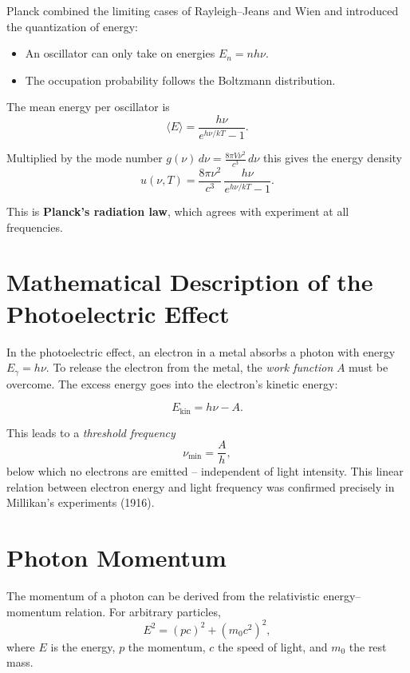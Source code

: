 Planck combined the limiting cases of Rayleigh–Jeans and Wien and introduced
the quantization of energy:

\begin{itemize}
	\item An oscillator can only take on energies $E_n = nh\nu$.
	\item The occupation probability follows the Boltzmann distribution.
\end{itemize}

The mean energy per oscillator is
\[
\langle E \rangle = \frac{h\nu}{e^{h\nu/kT} - 1}.
\]

Multiplied by the mode number
$g(\nu)\, d\nu = \tfrac{8\pi V \nu^2}{c^3}\, d\nu$
this gives the energy density
\[
u(\nu, T) = \frac{8\pi \nu^2}{c^3}\,
\frac{h\nu}{e^{h\nu/kT} - 1}.
\]

This is \textbf{Planck’s radiation law}, which agrees with experiment at all
frequencies.

\section{Mathematical Description of the Photoelectric Effect}
\label{anhangA:photoeffekt}

In the photoelectric effect, an electron in a metal absorbs a photon with
energy $E_\gamma = h\nu$. To release the electron from the metal, the
\emph{work function} $A$ must be overcome. The excess energy goes into the
electron’s kinetic energy:

\[
E_\text{kin} = h\nu - A.
\]

This leads to a \emph{threshold frequency}
\[
\nu_\text{min} = \frac{A}{h},
\]
below which no electrons are emitted – independent of light intensity.
This linear relation between electron energy and light frequency was confirmed
precisely in Millikan’s experiments (1916).
\section{Photon Momentum}
\label{anhangA:impuls}

The momentum of a photon can be derived from the relativistic
energy–momentum relation. For arbitrary particles,
\[
E^2 = (pc)^2 + (m_0 c^2)^2 ,
\]
where $E$ is the energy, $p$ the momentum, $c$ the speed of light, and $m_0$ the rest mass.

